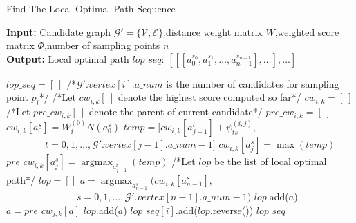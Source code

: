 \documentclass[a4paper,12pt]{article}
\begin{document}
 
\begin{CJK}{UTF8}{gbsn} 
\begin{algorithm} 
    \setcounter{algorithm}{0}
    \caption{Find The Local Optimal Path Sequence} 
    \hspace*{0.02in} {\bf Input:} Candidate graph $\mathcal{G}'=\{\mathcal{V},\mathcal{E}\}$,distance weight matrix $W$,weighted score matrix $\Phi$,number of sampling points $n$ \\ 
    \hspace*{0.02in} {\bf Output:} Local optimal path $lop\_seq$: $[[[a_0^{s_0},a_1^{s_1},\dots,a_{n-1}^{s_{n-1}}],\dots],\dots]$
    \begin{algorithmic}[1]
    \iffalse
    \fi
	\State $lop\_seq=[\ ]$
            \State /*$\mathcal{G}'.vertex[i].a\_num$ is the number of candidates for sampling point $p_i$*/
				\State /*Let $cw_{i,k}[\ ]$ denote the highest score computed so far*/ 
				\State $cw_{i,k} = [\ ]$ 
				\State /*Let $pre\_cw_{i,k}[\ ]$ denote the parent of current candidate*/ 
				\State $pre\_cw_{i,k} = [\ ]$ 
					\State $cw_{i,k}[a_0^s] = W_i^{(0)}N(a_0^s)$
				\EndFor
						\State $temp=[cw_{i,k}[a_{j-1}^t]+\psi_{ts}^{(i,j)},$
						\State $\qquad \quad \quad t=0,1,\dots,\mathcal{G}'.vertex[j-1].a\_num-1]$
						\State $cw_{i,k}[a_{j}^s] = \max{(temp)}$
						\State $pre\_cw_{i,k}[a_j^s] = \mathop{\mathrm{argmax}}_{a_{j-1}^t}{(temp)}
$
					\EndFor
				\EndFor
				\State /*Let $lop$ be the list of local optimal path*/
				\State $lop = []$
				\State $a = \mathop{\mathrm{argmax}}_{a_{n-1}^s}{(cw_{i,k}[a_{n-1}^s],}$
				\State $\qquad \qquad \qquad \quad \; s=0,1,\dots,\mathcal{G}'.vertex[n-1].a\_num-1)$
					\State $lop$.add($a$)
					\State $a = pre\_cw_{j,k}[a]$
				\EndFor
				\State $lop$.add($a$)
				\State $lop\_seq[i]$.add($lop$.reverse())
			\EndFor
        \EndFor
	\State \Return $lop\_seq$
    \end{algorithmic} 
\end{algorithm}
\end{CJK} 
\end{document}
